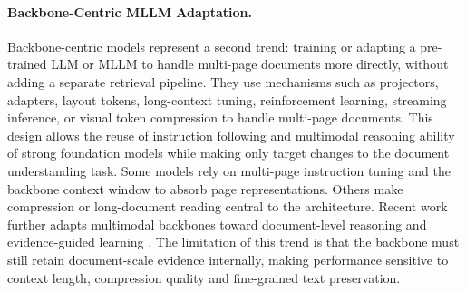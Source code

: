 \documentclass[11pt]{article}
\begin{document}

\paragraph{Backbone-Centric MLLM Adaptation.}
Backbone-centric models represent a second trend: training or adapting a pre-trained LLM or MLLM to handle multi-page documents more directly, without adding a separate retrieval pipeline. They use mechanisms such as projectors, adapters, layout tokens, long-context tuning, reinforcement learning, streaming inference, or visual token compression to handle multi-page documents. This design allows the reuse of instruction following and multimodal reasoning ability of strong foundation models while making only target changes to the document understanding task. Some models \cite{jia2024leopard, tanaka2024instructdoc} rely on multi-page instruction tuning and the backbone context window to absorb page representations. Others \cite{hu2024mplug, hannan2025docslm, yu2024texthawk2} make compression or long-document reading central to the architecture. Recent work further adapts multimodal backbones toward document-level reasoning and evidence-guided learning \cite{duan2025docopilot, xiong2026docr1}. The limitation of this trend is that the backbone must still retain document-scale evidence internally, making performance sensitive to context length, compression quality and fine-grained text preservation.
 
\end{document}
